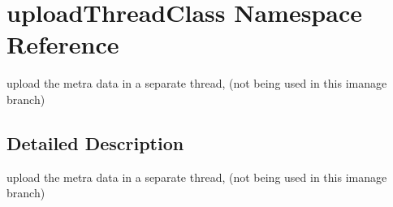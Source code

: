 \hypertarget{namespaceuploadThreadClass}{}\section{upload\+Thread\+Class Namespace Reference}
\label{namespaceuploadThreadClass}


upload the metra data in a separate thread, (not being used in this imanage branch)  




\subsection{Detailed Description}
upload the metra data in a separate thread, (not being used in this imanage branch) 